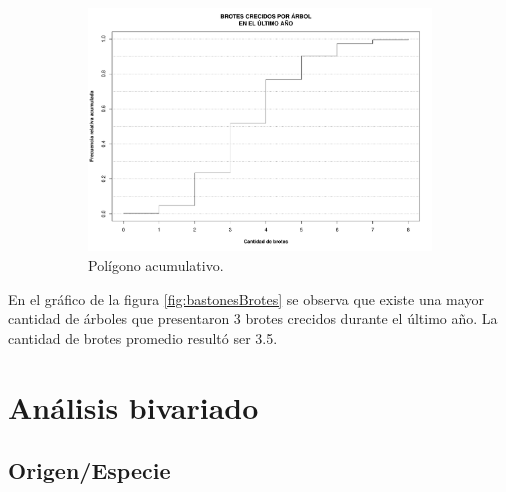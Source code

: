 \documentclass[11pt]{article}
\begin{document}
\begin{figure}[h!]
  \ContinuedFloat
  \begin{center}
    \begin{subfigure}[b]{0.9\linewidth}
      \includegraphics[width=\linewidth]{acumBrotes.pdf}
      \caption{Polígono acumulativo.}
      \label{fig:acumBrotes}
    \end{subfigure}
  \caption{}
  \end{center}  
\end{figure}

\newpage

\begin{justify}
  En el gráfico de la figura \ref{fig:bastonesBrotes} se observa que
  existe una mayor cantidad de árboles que presentaron 3 brotes crecidos
  durante el último año. La cantidad de brotes promedio resultó ser 3.5.
\end{justify}


\newpage
\section{Análisis bivariado}
\subsection{Origen/Especie}
\end{document}
